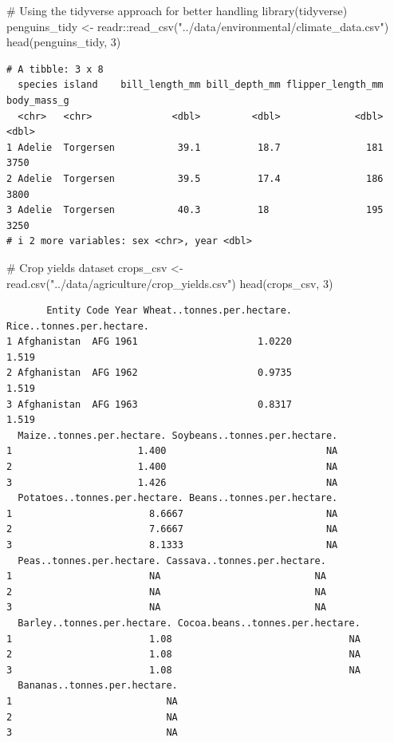 \documentclass[
  letterpaper,
]{book}
\newenvironment{Shaded}{\begin{snugshade}}{\end{snugshade}}
\newcommand{\CommentTok}[1]{\textcolor[rgb]{0.37,0.37,0.37}{#1}}
\newcommand{\DecValTok}[1]{\textcolor[rgb]{0.68,0.00,0.00}{#1}}
\newcommand{\FunctionTok}[1]{\textcolor[rgb]{0.28,0.35,0.67}{#1}}
\newcommand{\NormalTok}[1]{\textcolor[rgb]{0.00,0.23,0.31}{#1}}
\newcommand{\OtherTok}[1]{\textcolor[rgb]{0.00,0.23,0.31}{#1}}
\newcommand{\SpecialCharTok}[1]{\textcolor[rgb]{0.37,0.37,0.37}{#1}}
\newcommand{\StringTok}[1]{\textcolor[rgb]{0.13,0.47,0.30}{#1}}
\begin{document}
\begin{Shaded}
\begin{Highlighting}[]
\CommentTok{\# Using the tidyverse approach for better handling}
\FunctionTok{library}\NormalTok{(tidyverse)}
\NormalTok{penguins\_tidy }\OtherTok{\textless{}{-}}\NormalTok{ readr}\SpecialCharTok{::}\FunctionTok{read\_csv}\NormalTok{(}\StringTok{"../data/environmental/climate\_data.csv"}\NormalTok{)}
\FunctionTok{head}\NormalTok{(penguins\_tidy, }\DecValTok{3}\NormalTok{)}
\end{Highlighting}
\end{Shaded}

\begin{verbatim}
# A tibble: 3 x 8
  species island    bill_length_mm bill_depth_mm flipper_length_mm body_mass_g
  <chr>   <chr>              <dbl>         <dbl>             <dbl>       <dbl>
1 Adelie  Torgersen           39.1          18.7               181        3750
2 Adelie  Torgersen           39.5          17.4               186        3800
3 Adelie  Torgersen           40.3          18                 195        3250
# i 2 more variables: sex <chr>, year <dbl>
\end{verbatim}

\begin{Shaded}
\begin{Highlighting}[]
\CommentTok{\# Crop yields dataset}
\NormalTok{crops\_csv }\OtherTok{\textless{}{-}} \FunctionTok{read.csv}\NormalTok{(}\StringTok{"../data/agriculture/crop\_yields.csv"}\NormalTok{)}
\FunctionTok{head}\NormalTok{(crops\_csv, }\DecValTok{3}\NormalTok{)}
\end{Highlighting}
\end{Shaded}

\begin{verbatim}
       Entity Code Year Wheat..tonnes.per.hectare. Rice..tonnes.per.hectare.
1 Afghanistan  AFG 1961                     1.0220                     1.519
2 Afghanistan  AFG 1962                     0.9735                     1.519
3 Afghanistan  AFG 1963                     0.8317                     1.519
  Maize..tonnes.per.hectare. Soybeans..tonnes.per.hectare.
1                      1.400                            NA
2                      1.400                            NA
3                      1.426                            NA
  Potatoes..tonnes.per.hectare. Beans..tonnes.per.hectare.
1                        8.6667                         NA
2                        7.6667                         NA
3                        8.1333                         NA
  Peas..tonnes.per.hectare. Cassava..tonnes.per.hectare.
1                        NA                           NA
2                        NA                           NA
3                        NA                           NA
  Barley..tonnes.per.hectare. Cocoa.beans..tonnes.per.hectare.
1                        1.08                               NA
2                        1.08                               NA
3                        1.08                               NA
  Bananas..tonnes.per.hectare.
1                           NA
2                           NA
3                           NA
\end{verbatim}
\end{document}
